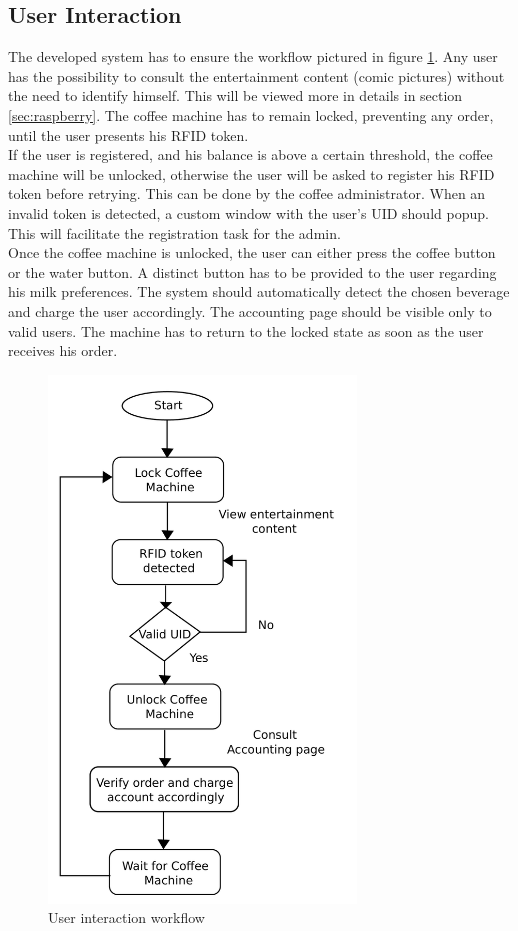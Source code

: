 \documentclass[12pt]{article}
\begin{document}
  \subsection{User Interaction}
  The developed system has to ensure the workflow pictured in figure \ref{fig:workflow}.
  Any user has the possibility to consult the entertainment content (comic pictures) without the need to identify himself. This will be viewed more in details in section \ref{sec:raspberry}.
  The coffee machine has to remain locked, preventing any order, until the user presents his RFID token.\\
  If the user is registered, and his balance is above a certain threshold, the coffee machine will be unlocked, otherwise the user will be asked to register his RFID token before retrying.
  This can be done by the coffee administrator. When an invalid token is detected, a custom window with the user's UID should popup. This will facilitate the registration task for the admin.\\
  Once the coffee machine is unlocked, the user can either press the coffee button or the water button. A distinct button has to be provided to the user regarding his milk preferences.
  The system should automatically detect the chosen beverage and charge the user accordingly. The accounting page should be visible only to valid users.
  The machine has to return to the locked state as soon as the user receives his order.
  
   \begin{figure}[H]
   \centering
   \includegraphics[height=14cm]{./images/workflow}
   \captionsetup{justification=centering}
   \caption{User interaction workflow}
   \label{fig:workflow}
  \end{figure}
\end{document}
